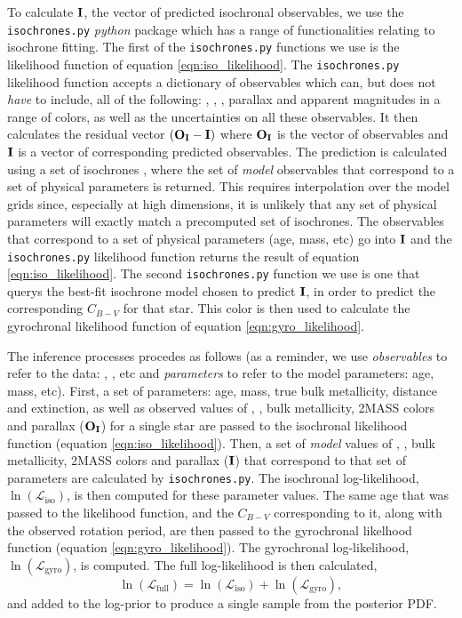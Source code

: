 To calculate ${\bf I}$, the vector of predicted isochronal observables, we use
the {\tt isochrones.py} {\it python} package which has a range of
functionalities relating to isochrone fitting.
The first of the {\tt isochrones.py} functions we use is the likelihood
function of equation \ref{eqn:iso_likelihood}.
The {\tt isochrones.py} likelihood function accepts a dictionary of
observables which can, but does not {\it have} to include, all of the
following: \teff, \logg, \feh, parallax and apparent magnitudes in a range of
colors, as well as the uncertainties on all these observables.
It then calculates the residual vector $({\bf O_I} - {\bf I})$ where ${\bf
O_I}$ is the vector of observables and ${\bf I}$ is a vector of corresponding
predicted observables.
The prediction is calculated using a set of isochrones \citep[we use the MIST
models][]{choi}, where the set of {\it model} observables that correspond to a
set of physical parameters is returned.
This requires interpolation over the model grids since, especially at high
dimensions, it is unlikely that any set of physical parameters will exactly
match a precomputed set of isochrones.
The observables that correspond to a set of physical parameters (age, mass,
etc) go into ${\bf I}$ and the {\tt isochrones.py} likelihood function returns
the result of equation \ref{eqn:iso_likelihood}.
The second {\tt isochrones.py} function we use is one that querys the best-fit
isochrone model chosen to predict ${\bf I}$, in order to predict the
corresponding $C_{B-V}$ for that star.
This color is then used to calculate the gyrochronal likelihood function of
equation \ref{eqn:gyro_likelihood}.

The inference processes procedes as follows (as a reminder, we use {\it
observables} to refer to the data: \teff, \logg, etc and {\it parameters} to
refer to the model parameters: age, mass, etc).
First, a set of parameters: age, mass, true bulk metallicity, distance and
extinction, as well as observed values of \teff, \logg, bulk metallicity,
2MASS colors and parallax (${\bf O_I}$) for a single star are passed to the
isochronal likelihood function (equation \ref{eqn:iso_likelihood}).
Then, a set of {\it model} values of \teff, \logg, bulk metallicity, 2MASS
colors and parallax (${\bf I}$) that correspond to that set of parameters are
calculated by {\tt isochrones.py}.
The isochronal log-likelihood, $\ln(\mathcal{L}_{\mathrm{iso}})$, is then
computed for these parameter values.
The same age that was passed to the likelihood function, and the $C_{B-V}$
corresponding to it, along with the observed rotation period, are then passed
to the gyrochronal likelhood function (equation \ref{eqn:gyro_likelihood}).
The gyrochronal log-likelihood, $\ln(\mathcal{L}_{\mathrm{gyro}})$, is
computed.
The full log-likelihood is then calculated,
\begin{equation}
\ln(\mathcal{L}_{\mathrm{full}})
= \ln(\mathcal{L}_{\mathrm{iso}}) + \ln(\mathcal{L}_{\mathrm{gyro}}),
\label{eqn:both_likelihood}
\end{equation}
and added to the log-prior to produce a single sample from the posterior PDF.

